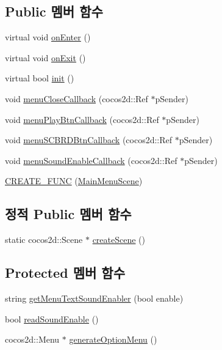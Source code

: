\subsection*{Public 멤버 함수}
\begin{DoxyCompactItemize}
\item 
virtual void \hyperlink{class_tetris_1_1_cocos2d_scenes_1_1_main_menu_scene_a63cfd0adc032b868536a89b103c44fc5}{on\+Enter} ()
\item 
virtual void \hyperlink{class_tetris_1_1_cocos2d_scenes_1_1_main_menu_scene_a021af73aac74c3e90113812882b3e0bb}{on\+Exit} ()
\item 
virtual bool \hyperlink{class_tetris_1_1_cocos2d_scenes_1_1_main_menu_scene_ae4d89ddd3650f5f24e86ea631092ecb9}{init} ()
\item 
void \hyperlink{class_tetris_1_1_cocos2d_scenes_1_1_main_menu_scene_a9bf1239efe00c6fda79c4d080d9a08aa}{menu\+Close\+Callback} (cocos2d\+::\+Ref $\ast$p\+Sender)
\item 
void \hyperlink{class_tetris_1_1_cocos2d_scenes_1_1_main_menu_scene_a19f4cf80f17731583bec6a25d8de5acd}{menu\+Play\+Btn\+Callback} (cocos2d\+::\+Ref $\ast$p\+Sender)
\item 
void \hyperlink{class_tetris_1_1_cocos2d_scenes_1_1_main_menu_scene_a2fdee3d586584f0186569ccd13d2d7fc}{menu\+S\+C\+B\+R\+D\+Btn\+Callback} (cocos2d\+::\+Ref $\ast$p\+Sender)
\item 
void \hyperlink{class_tetris_1_1_cocos2d_scenes_1_1_main_menu_scene_a0a6113964573664add11cd1e08ffdd03}{menu\+Sound\+Enable\+Callback} (cocos2d\+::\+Ref $\ast$p\+Sender)
\item 
\hyperlink{class_tetris_1_1_cocos2d_scenes_1_1_main_menu_scene_a16e190dfef8b0c64f1c5bb03880dd8f7}{C\+R\+E\+A\+T\+E\+\_\+\+F\+U\+NC} (\hyperlink{class_tetris_1_1_cocos2d_scenes_1_1_main_menu_scene}{Main\+Menu\+Scene})
\end{DoxyCompactItemize}
\subsection*{정적 Public 멤버 함수}
\begin{DoxyCompactItemize}
\item 
static cocos2d\+::\+Scene $\ast$ \hyperlink{class_tetris_1_1_cocos2d_scenes_1_1_main_menu_scene_a46eb7e1d9999c6ed8e9acf49cfcd21cf}{create\+Scene} ()
\end{DoxyCompactItemize}
\subsection*{Protected 멤버 함수}
\begin{DoxyCompactItemize}
\item 
string \hyperlink{class_tetris_1_1_cocos2d_scenes_1_1_main_menu_scene_a0c0e61e744b15a2e2c55ad37be625c2f}{get\+Menu\+Text\+Sound\+Enabler} (bool enable)
\item 
bool \hyperlink{class_tetris_1_1_cocos2d_scenes_1_1_main_menu_scene_a0454c0398dc84b0c8f9e1b3ff72da69d}{read\+Sound\+Enable} ()
\item 
cocos2d\+::\+Menu $\ast$ \hyperlink{class_tetris_1_1_cocos2d_scenes_1_1_main_menu_scene_a1d29d6f4c75637e30b6a7621b3c74ac7}{generate\+Option\+Menu} ()
\end{DoxyCompactItemize}
